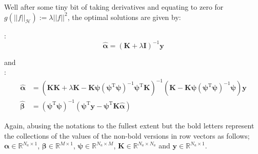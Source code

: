 \documentclass{tran-l}
\theoremstyle{definition}
\theoremstyle{remark}
\numberwithin{equation}{section}
\newcommand{\mR}{\mathbb{R}}
\begin{document}
Well after some tiny bit of taking derivatives and equating to zero for $g(||f||_\mathcal{H}):=\lambda||f||^2$, the optimal solutions are given by:

:
\begin{equation}
 \hat{\boldsymbol{\alpha}}=(\mathbf{K}+\lambda \mathbf{I})^{-1}\mathbf{y}
\end{equation}

and \\

: 
\begin{align}
  \hat{\boldsymbol{\alpha}}&=(\mathbf{K}\mathbf{K}+\lambda\mathbf{K}-\mathbf{K}\boldsymbol{\psi}(\boldsymbol{\psi}^\text{T}\boldsymbol{\psi})^{-1}\boldsymbol{\psi}^\text{T}\mathbf{K})^{-1}(\mathbf{K}-\mathbf{K}\boldsymbol{\psi}(\boldsymbol{\psi}^\text{T}\boldsymbol{\psi})^{-1}\boldsymbol{\psi})\mathbf{y} \\ 
  \hat{\boldsymbol{\beta}}&=(\boldsymbol{\psi}^\text{T}\boldsymbol{\psi})^{-1}(\boldsymbol{\psi}^\text{T}\mathbf{y}-\boldsymbol{\psi}^\text{T}\mathbf{K}\hat{\boldsymbol{\alpha}})
\label{eq:optimum}
\end{align}

\rem Again, abusing the notations to the fullest extent but the bold letters represent the collections of the values of the non-bold versions in row vectors as follows;
$\boldsymbol{\alpha}\in\mR^{N_a\times 1}$, $\boldsymbol{\beta}\in\mR^{M\times 1}$, $\boldsymbol{\psi}\in\mR^{N_a\times M}$, $\mathbf{K}\in\mR^{N_a\times N_a}$ and $\mathbf{y}\in\mR^{N_a\times 1}$.
\end{document}
